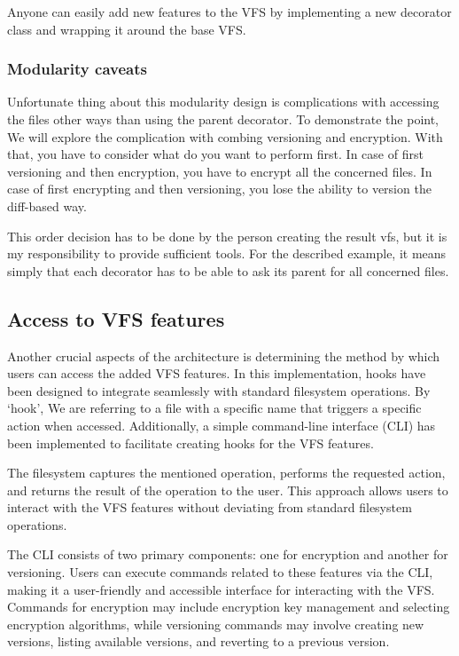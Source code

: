 Anyone can easily add new features to the VFS by implementing a new decorator class and wrapping it around the base VFS\@.

\subsubsection{Modularity caveats}\label{subsubsec:modularity-cavs}

Unfortunate thing about this modularity design is complications with accessing the files other ways than using the parent decorator.
To demonstrate the point, We will explore the complication with combing versioning and encryption.
With that, you have to consider what do you want to perform first.
In case of first versioning and then encryption, you have to encrypt all the concerned files.
In case of first encrypting and then versioning, you lose the ability to version the diff-based way.

This order decision has to be done by the person creating the result vfs, but it is my responsibility to provide sufficient tools.
For the described example, it means simply that each decorator has to be able to ask its parent for all concerned files.

\subsection{Access to VFS features}\label{subsec:access-to-vfs-features}

Another crucial aspects of the architecture is determining the method by which users can access the added VFS features.
In this implementation, hooks have been designed to integrate seamlessly with standard filesystem operations.
By `hook', We are referring to a file with a specific name that triggers a specific action when accessed.
Additionally, a simple command-line interface (CLI) has been implemented to facilitate creating hooks for the VFS features.

The filesystem captures the mentioned operation, performs the requested action, and returns the result of the operation to the user.
This approach allows users to interact with the VFS features without deviating from standard filesystem operations.

The CLI consists of two primary components: one for encryption and another for versioning.
Users can execute commands related to these features via the CLI, making it a user-friendly and accessible interface for interacting with the VFS\@.
Commands for encryption may include encryption key management and selecting encryption algorithms, while versioning commands may involve creating new versions, listing available versions, and reverting to a previous version.

